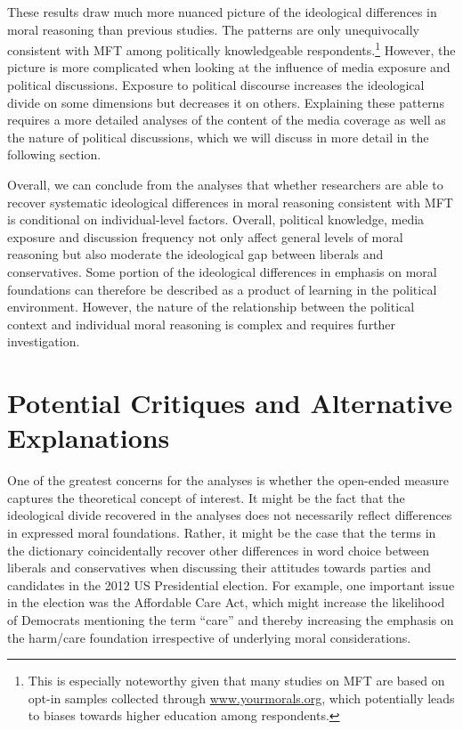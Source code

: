 \documentclass[12pt]{article}
\begin{document}
These results draw much more nuanced picture of the ideological differences in moral reasoning than previous studies. The patterns are only unequivocally consistent with MFT among politically knowledgeable respondents.\footnote{This is especially noteworthy given that many studies on MFT are based on opt-in samples collected through \url{www.yourmorals.org}, which potentially leads to biases towards higher education among respondents.} However, the picture is more complicated when looking at the influence of media exposure and political discussions. Exposure to political discourse increases the ideological divide on some dimensions but decreases it on others. Explaining these patterns requires a more detailed analyses of the content of the media coverage as well as the nature of political discussions, which we will discuss in more detail in the following section.

Overall, we can conclude from the analyses that whether researchers are able to recover systematic ideological differences in moral reasoning consistent with MFT is conditional on individual-level factors. Overall, political knowledge, media exposure and discussion frequency not only affect general levels of moral reasoning but also moderate the ideological gap between liberals and conservatives. Some portion of the ideological differences in emphasis on moral foundations can therefore be described as a product of learning in the political environment. However, the nature of the relationship between the political context and individual moral reasoning is complex and requires further investigation.


\section*{Potential Critiques and Alternative Explanations}

One of the greatest concerns for the analyses is whether the open-ended measure captures the theoretical concept of interest. It might be the fact that the ideological divide recovered in the analyses does not necessarily reflect differences in expressed moral foundations. Rather, it might be the case that the terms in the dictionary coincidentally recover other differences in word choice between liberals and conservatives when discussing their attitudes towards parties and candidates in the 2012 US Presidential election. For example, one important issue in the election was the Affordable Care Act, which might increase the likelihood of Democrats mentioning the term ``care'' and thereby increasing the emphasis on the harm/care foundation irrespective of underlying moral considerations.
\end{document}

